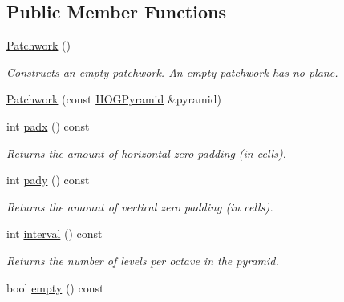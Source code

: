 \subsection*{Public Member Functions}
\begin{DoxyCompactItemize}
\item 
\hypertarget{class_f_f_l_d_1_1_patchwork_a57c40d2ceddfb9dd64efb9b2bb5d9a9e}{\hyperlink{class_f_f_l_d_1_1_patchwork_a57c40d2ceddfb9dd64efb9b2bb5d9a9e}{Patchwork} ()}\label{class_f_f_l_d_1_1_patchwork_a57c40d2ceddfb9dd64efb9b2bb5d9a9e}

\begin{DoxyCompactList}\small\item\em Constructs an empty patchwork. An empty patchwork has no plane. \end{DoxyCompactList}\item 
\hyperlink{class_f_f_l_d_1_1_patchwork_aa38d8158bbfff82f625d7ddae0b5cd58}{Patchwork} (const \hyperlink{class_f_f_l_d_1_1_h_o_g_pyramid}{H\-O\-G\-Pyramid} \&pyramid)
\item 
\hypertarget{class_f_f_l_d_1_1_patchwork_ae16a7a8143f5a8b05cf9d54ae2d4b262}{int \hyperlink{class_f_f_l_d_1_1_patchwork_ae16a7a8143f5a8b05cf9d54ae2d4b262}{padx} () const }\label{class_f_f_l_d_1_1_patchwork_ae16a7a8143f5a8b05cf9d54ae2d4b262}

\begin{DoxyCompactList}\small\item\em Returns the amount of horizontal zero padding (in cells). \end{DoxyCompactList}\item 
\hypertarget{class_f_f_l_d_1_1_patchwork_ab9275f8b38a747ab59fc2c54f89d8b62}{int \hyperlink{class_f_f_l_d_1_1_patchwork_ab9275f8b38a747ab59fc2c54f89d8b62}{pady} () const }\label{class_f_f_l_d_1_1_patchwork_ab9275f8b38a747ab59fc2c54f89d8b62}

\begin{DoxyCompactList}\small\item\em Returns the amount of vertical zero padding (in cells). \end{DoxyCompactList}\item 
\hypertarget{class_f_f_l_d_1_1_patchwork_a37da8d780e23b79eeeea570a0a888da1}{int \hyperlink{class_f_f_l_d_1_1_patchwork_a37da8d780e23b79eeeea570a0a888da1}{interval} () const }\label{class_f_f_l_d_1_1_patchwork_a37da8d780e23b79eeeea570a0a888da1}

\begin{DoxyCompactList}\small\item\em Returns the number of levels per octave in the pyramid. \end{DoxyCompactList}\item 
\hypertarget{class_f_f_l_d_1_1_patchwork_a33d7a3b3e96b48a05ba23ca558d09f33}{bool \hyperlink{class_f_f_l_d_1_1_patchwork_a33d7a3b3e96b48a05ba23ca558d09f33}{empty} () const }\label{class_f_f_l_d_1_1_patchwork_a33d7a3b3e96b48a05ba23ca558d09f33}


\end{DoxyCompactItemize}
